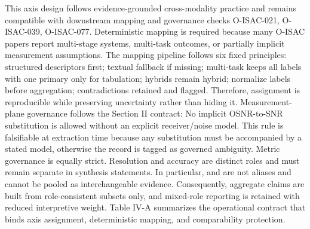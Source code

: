 {}This axis design follows evidence-grounded cross-modality practice and remains compatible with downstream mapping and governance checks O-ISAC-021, O-ISAC-039, O-ISAC-077.\markdownRendererInterblockSeparator
{}
\markdownRendererSectionEnd \markdownRendererSectionBegin
{}\markdownRendererInterblockSeparator
{}Deterministic mapping is required because many O-ISAC papers report multi-stage systems, multi-task outcomes, or partially implicit measurement assumptions. The mapping pipeline follows six fixed principles: structured descriptors first; textual fallback if missing; multi-task keeps all labels with one primary only for tabulation; hybrids remain hybrid; normalize labels before aggregation; contradictions retained and flagged. Therefore, assignment is reproducible while preserving uncertainty rather than hiding it.\markdownRendererParagraphSeparator
{}Measurement-plane governance follows the Section II contract:\markdownRendererSoftLineBreak
{}\markdownRendererSoftLineBreak
{}No implicit OSNR-to-SNR substitution is allowed without an explicit receiver/noise model. This rule is falsifiable at extraction time because any substitution must be accompanied by a stated model, otherwise the record is tagged as governed ambiguity.\markdownRendererParagraphSeparator
{}Metric governance is equally strict. Resolution and accuracy are distinct roles and must remain separate in synthesis statements. In particular,  and  are not aliases and cannot be pooled as interchangeable evidence. Consequently, aggregate claims are built from role-consistent subsets only, and mixed-role reporting is retained with reduced interpretive weight.\markdownRendererParagraphSeparator
{}Table IV-A summarizes the operational contract that binds axis assignment, deterministic mapping, and comparability protection.\markdownRendererInterblockSeparator
